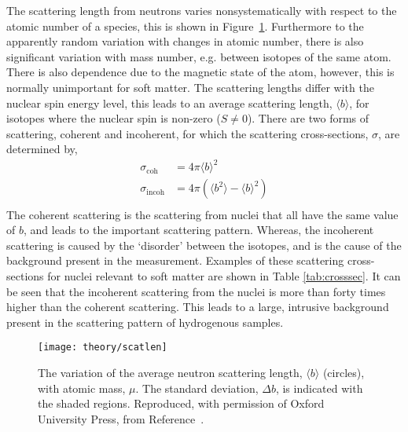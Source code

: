 The scattering length from neutrons varies nonsystematically with respect to the atomic number of a species, this is shown in Figure~\ref{fig:scatlen}.
Furthermore to the apparently random variation with changes in atomic number, there is also significant variation with mass number, e.g. between isotopes of the same atom.
There is also dependence due to the magnetic state of the atom, however, this is normally unimportant for soft matter.
The scattering lengths differ with the nuclear spin energy level, this leads to an average scattering length, $\langle b \rangle$, for isotopes where the nuclear spin is non-zero ($S\neq 0$).
There are two forms of scattering, coherent and incoherent, for which the scattering cross-sections, $\sigma$, are determined by,
%
\begin{equation}
    \begin{aligned}
        \sigma_{\text{coh}} & = 4\pi\langle b \rangle ^2 \\
        \sigma_{\text{incoh}} & = 4\pi(\langle b ^ 2 \rangle - \langle b \rangle ^2) \\
    \end{aligned}
\end{equation}
%
The coherent scattering is the scattering from nuclei that all have the same value of $b$, and leads to the important scattering pattern.
Whereas, the incoherent scattering is caused by the `disorder' between the isotopes, and is the cause of the background present in the measurement.
Examples of these scattering cross-sections for nuclei relevant to soft matter are shown in Table \ref{tab:crosssec}.
It can be seen that the incoherent scattering from the  nuclei is more than forty times higher than the coherent scattering.
This leads to a large, intrusive background present in the scattering pattern of hydrogenous samples.
%
\begin{figure}
    \centering
    \texttt{[image: theory/scatlen]}
    \caption{The variation of the average neutron scattering length, $\langle b \rangle$ (circles), with atomic mass, $\mu$. The standard deviation, $\Delta b$, is indicated with the shaded regions. Reproduced, with permission of Oxford University Press\textsuperscript{\textcopyright}, from Reference~\cite{sivia_elementary_2011}.}
    \label{fig:scatlen}
\end{figure}
%
